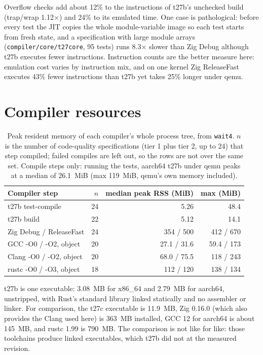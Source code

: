 \documentclass[11pt,a4paper]{article}
\begin{document}
Overflow checks add about 12\% to the instructions of t27b's unchecked
build (trap/wrap 1.12$\times$) and 24\% to its emulated time. One case is pathological: before every test the JIT copies
the whole module-variable image so each test starts from fresh state, and
a specification with large module arrays (\texttt{compiler/core/t27core},
95 tests) runs 8.3$\times$ slower than Zig Debug although t27b executes
fewer instructions. Instruction counts are the better measure here:
emulation cost varies by instruction mix, and on one kernel Zig
ReleaseFast executes 43\% fewer instructions than t27b yet takes 25\%
longer under qemu.

\section{Compiler resources}
\label{sec:resources}

\begin{table}[h]
\centering
\small
\begin{tabular}{@{}lrrr@{}}
\toprule
Compiler step & $n$ & median peak RSS (MiB) & max (MiB) \\
\midrule
t27b test-compile & 24 & 5.26 & 48.4 \\
t27b build & 22 & 5.12 & 14.1 \\
Zig Debug / ReleaseFast & 24 & 354 / 500 & 412 / 670 \\
GCC -O0 / -O2, object & 20 & 27.1 / 31.6 & 59.4 / 173 \\
Clang -O0 / -O2, object & 20 & 68.0 / 75.5 & 118 / 243 \\
rustc -O0 / -O3, object & 18 & 112 / 120 & 138 / 134 \\
\bottomrule
\end{tabular}
\caption{Peak resident memory of each compiler's whole process tree, from
\texttt{wait4}. $n$ is the number of code-quality specifications (tier 1
plus tier 2, up to 24) that step compiled; failed compiles are left out,
so the rows are not over the same set. Compile steps only: running the
tests, aarch64 t27b under qemu peaks at a median of 26.1~MiB (max 119~MiB,
qemu's own memory included).}
\label{tab:mem}
\end{table}

t27b is one executable: 3.08~MB for x86\_64 and 2.79~MB for aarch64,
unstripped, with Rust's standard library linked statically and no
assembler or linker. For comparison, the t27c executable is 11.9~MB, Zig
0.16.0 (which also provides the Clang used here) is 363~MB installed, GCC
12 for aarch64 is about 145~MB, and rustc 1.99 is 790~MB. The comparison
is not like for like: those toolchains produce linked executables, which
t27b did not at the measured revision.
\end{document}

